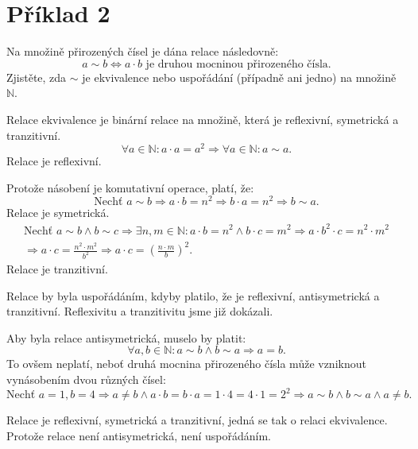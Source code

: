 \documentclass[12pt,a4paper]{article}
\newcommand{\pageline}{\noindent\makebox[\linewidth]{\rule{\linewidth}{0.4pt}}\vspace{5pt}}
\begin{document}
\newpage

\section*{Příklad 2}

Na množině přirozených čísel je dána relace následovně:
\begin{equation*}
    a \sim b \iff a \cdot b \text{ je druhou mocninou přirozeného čísla}.
\end{equation*}
Zjistěte, zda $\sim$ je ekvivalence nebo uspořádání (případně ani jedno) na množině $\mathbb{N}$.

\pageline

Relace ekvivalence je binární relace na množině, která je reflexivní, symetrická a tranzitivní.
\[
    \forall a \in \mathbb{N}: a \cdot a = a^2 \Rightarrow \forall a \in \mathbb{N}: a \sim a.
\]
Relace je reflexivní.

Protože násobení je komutativní operace, platí, že:
\[
    \text{Nechť } a \sim b \Rightarrow a \cdot b = n^2 \Rightarrow b \cdot a = n^2 \Rightarrow b \sim a.
\]
Relace je symetrická.
\begin{multline*}
\text{Nechť } a \sim b \land b \sim c \Rightarrow \exists n,m \in \mathbb{N}: a \cdot b = n^2 \land b \cdot c = m^2 \Rightarrow a \cdot b^2 \cdot c = n^2 \cdot m^2\\ \Rightarrow a \cdot c = \frac{n^2 \cdot m^2}{b^2} \Rightarrow a \cdot c = \left(\frac{n \cdot m}{b}\right)^2.
\end{multline*}
Relace je tranzitivní.

Relace by byla uspořádáním, kdyby platilo, že je reflexivní, antisymetrická a tranzitivní. Reflexivitu a tranzitivitu jsme již dokázali.

Aby byla relace antisymetrická, muselo by platit:
\[
   \forall a,b \in \mathbb{N}: a \sim b \land b \sim a \Rightarrow a = b.
\]
To ovšem neplatí, neboť druhá mocnina přirozeného čísla může vzniknout vynásobením dvou různých čísel:
\[
   \text{Nechť } a = 1, b = 4 \Rightarrow a \neq b \land a \cdot b = b \cdot a = 1 \cdot 4 = 4 \cdot 1 = 2^2 \Rightarrow a \sim b \land b \sim a \land a \neq b.
\]

Relace je reflexivní, symetrická a tranzitivní, jedná se tak o relaci ekvivalence. Protože relace není antisymetrická, není uspořádáním.
\end{document}
